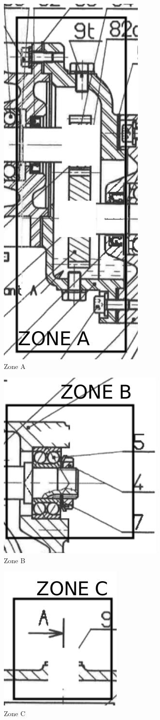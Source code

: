 \begin{figure}[!h]
 \centering\includegraphics[width=0.35\linewidth]{img/Moto_reducteur_frein_vierge_A}
 \caption{Zone A}
 \label{img_zoneA}
\end{figure}

\newpage


\begin{figure}[!h]
 \centering\includegraphics[width=0.4\linewidth]{img/Moto_reducteur_frein_vierge_B}
 \caption{Zone B}
 \label{img_zoneB}
\end{figure}


\begin{figure}[!h]
 \centering\includegraphics[width=0.4\linewidth]{img/Moto_reducteur_frein_vierge_C}
 \caption{Zone C}
 \label{img_zoneC}
\end{figure}

